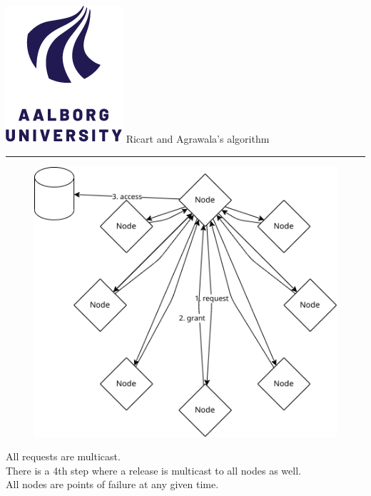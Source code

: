 \documentclass[aspectratio=1610,17pt,utf8]{beamer}
\newcommand{\regularframe}[1]{\color{black}\includegraphics[width=.05\textwidth]{figures/aau.png} #1\\\hrule}
\begin{document}
\begin{frame}{\regularframe{Ricart and Agrawala's algorithm}}
    \begin{minipage}{.45\textwidth}
        \begin{figure}
            \includegraphics[width=\textwidth]{figures/1-ricart-agrawala.png}
        \end{figure}
    \end{minipage}
    \begin{minipage}{.5\textwidth}
        \tiny{All requests are multicast.\\There is a 4th step where a release is multicast to all nodes as well.\\All nodes are points of failure at any given time.}
    \end{minipage}
\end{frame}

\end{document}
